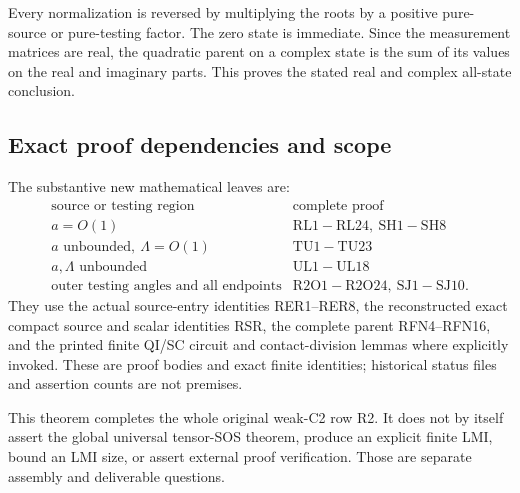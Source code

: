 Every normalization is reversed by multiplying the roots by
a positive pure-source or pure-testing factor.  The zero
state is immediate.  Since the measurement matrices are real,
the quadratic parent on a complex state is the sum of its
values on the real and imaginary parts.  This proves the
stated real and complex all-state conclusion.

\subsection{Exact proof dependencies and scope}

The substantive new mathematical leaves are:
\[
\begin{array}{c|l}
 \text{source or testing region}&\text{complete proof}\\ \hline
 a=O(1)&\mathrm{RL1\!-\!RL24,\ SH1\!-\!SH8}\\
 a\text{ unbounded},\ \Lambda=O(1)&\mathrm{TU1\!-\!TU23}\\
 a,\Lambda\text{ unbounded}&\mathrm{UL1\!-\!UL18}\\
 \text{outer testing angles and all endpoints}&
                   \mathrm{R2O1\!-\!R2O24,\ SJ1\!-\!SJ10}.
\end{array}                                                     \tag{R2A4}
\]
They use the actual source-entry identities RER1--RER8,
the reconstructed exact compact source and scalar identities
RSR, the complete parent RFN4--RFN16, and the printed finite
QI/SC circuit and contact-division lemmas where explicitly
invoked.  These are proof bodies and exact finite identities;
historical status files and assertion counts are not premises.

This theorem completes the whole original weak-C2 row R2.
It does not by itself assert the global universal tensor-SOS
theorem, produce an explicit finite LMI, bound an LMI size,
or assert external proof verification.  Those are separate
assembly and deliverable questions.
